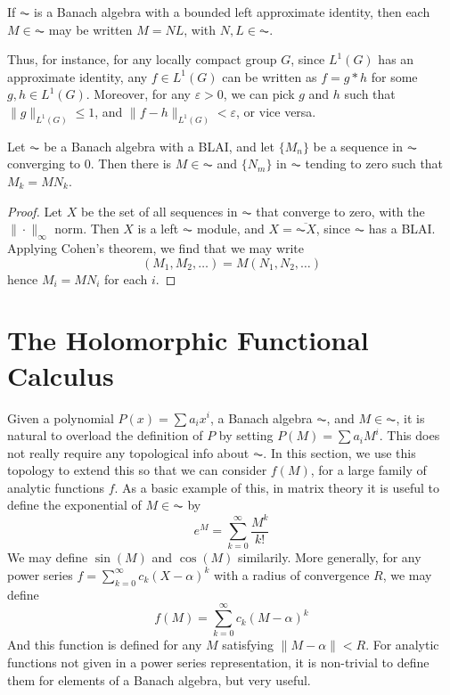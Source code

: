 \begin{corollary}
    If $\AC$ is a Banach algebra with a bounded left approximate identity, then each $M \in \AC$ may be written $M = NL$, with $N,L \in \AC$.
\end{corollary}

Thus, for instance, for any locally compact group $G$, since $L^1(G)$ has an approximate identity, any $f \in L^1(G)$ can be written as $f = g * h$ for some $g,h \in L^1(G)$. Moreover, for any $\varepsilon > 0$, we can pick $g$ and $h$ such that $\| g \|_{L^1(G)} \leq 1$, and $\| f - h \|_{L^1(G)} < \varepsilon$, or vice versa.

\begin{corollary}
    Let $\AC$ be a Banach algebra with a BLAI, and let $\{ M_n \}$ be a sequence in $\AC$ converging to 0. Then there is $M \in \AC$ and $\{ N_m \}$ in $\AC$ tending to zero such that $M_k = M N_k$.
\end{corollary}
\begin{proof}
    Let $X$ be the set of all sequences in $\AC$ that converge to zero, with the $\| \cdot \|_\infty$ norm. Then $X$ is a left $\AC$ module, and $X = \overline{\AC X}$, since $\AC$ has a BLAI. Applying Cohen's theorem, we find that we may write
    \[ (M_1, M_2, \dots) = M (N_1, N_2, \dots) \]
    hence $M_i = M N_i$ for each $i$.
\end{proof}






\section{The Holomorphic Functional Calculus}

Given a polynomial $P(x) = \sum a_i x^i$, a Banach algebra $\AC$, and $M \in \AC$, it is natural to overload the definition of $P$ by setting $P(M) = \sum a_i M^i$. This does not really require any topological info about $\AC$. In this section, we use this topology to extend this so that we can consider $f(M)$, for a large family of analytic functions $f$. As a basic example of this, in matrix theory it is useful to define the exponential of $M \in \AC$ by
%
\[ e^M = \sum_{k = 0}^\infty \frac{M^k}{k!} \]
%
We may define $\sin(M)$ and $\cos(M)$ similarily. More generally, for any power series $f = \sum_{k = 0}^\infty c_k (X - \alpha)^k$ with a radius of convergence $R$, we may define
%
\[ f(M) = \sum_{k = 0}^\infty c_k (M - \alpha)^k \]
%
And this function is defined for any $M$ satisfying $\|M - \alpha \| < R$. For analytic functions not given in a power series representation, it is non-trivial to define them for elements of a Banach algebra, but very useful.


